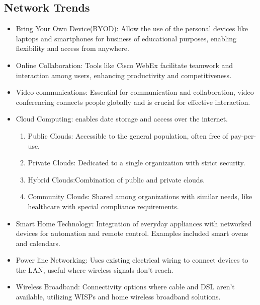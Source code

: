 \documentclass[a4paper,11pt]{article}
\begin{document}
\subsection{Network Trends}
\begin{itemize}
    \item Bring Your Own Device(BYOD): Allow the use of the personal devices like laptops and smartphones for business of educational purposes, enabling flexibility and access from anywhere.\\
    \item Online Collaboration: Tools like Cisco WebEx facilitate teamwork and interaction among users, enhancing productivity and competitiveness.\\
    \item Video communications: Essential for communication and collaboration, video conferencing connects people globally and is crucial for effective interaction.\\
    \item Cloud Computing: enables date storage and access over the internet.\\
    \begin{enumerate}
        \item Public Clouds: Accessible to the general population, often free of pay-per-use.\\
        \item Private Clouds: Dedicated to a single organization with strict security.\\
        \item Hybrid Clouds:Combination of public and private clouds.\\
        \item Community Clouds: Shared among organizations with similar needs, like healthcare with special compliance requirements.\\
    \end{enumerate}
    \item Smart Home Technology: Integration of everyday appliances with networked devices for automation and remote control. Examples included smart ovens and calendars.\\
    \item Power line Networking: Uses existing electrical wiring to connect devices to the LAN, useful where wireless signals don't reach.\\
    \item Wireless Broadband:  Connectivity options where cable and DSL aren't available, utilizing WISPs and home wireless broadband solutions.\\
\end{itemize}
\end{document}
